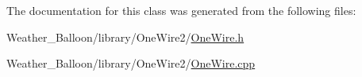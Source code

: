 The documentation for this class was generated from the following files\+:\begin{DoxyCompactItemize}
\item 
Weather\+\_\+\+Balloon/library/\+One\+Wire2/\hyperlink{_one_wire_8h}{One\+Wire.\+h}\item 
Weather\+\_\+\+Balloon/library/\+One\+Wire2/\hyperlink{_one_wire_8cpp}{One\+Wire.\+cpp}\end{DoxyCompactItemize}
